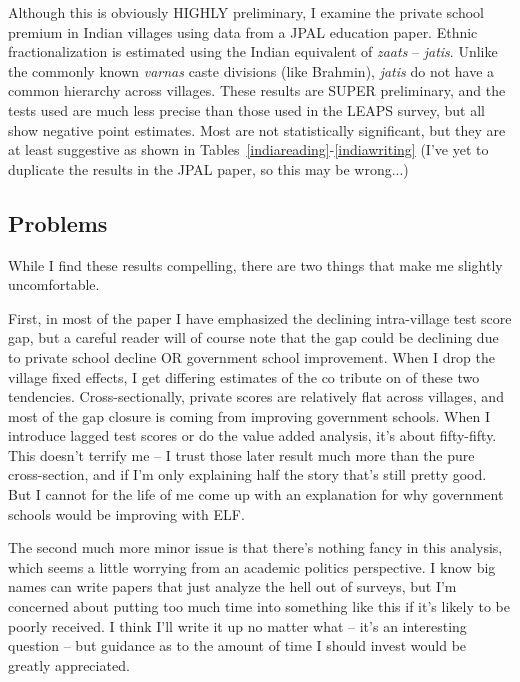 \documentclass[12pt]{article}
\begin{document}
Although this is obviously HIGHLY preliminary, I examine the private school premium in Indian villages using data from a JPAL education paper. Ethnic fractionalization is estimated using the Indian equivalent of \emph{zaats} -- \emph{jatis}. Unlike the commonly known \emph{varnas} caste divisions (like Brahmin), \emph{jatis} do not have a common hierarchy across villages. These results are SUPER preliminary, and the tests used are much less precise than those used in the LEAPS survey, but all show negative point estimates. Most are not statistically significant, but they are at least suggestive as shown in Tables~\ref{indiareading}-\ref{indiawriting} (I've yet to duplicate the results in the JPAL paper, so this may be wrong...) 







\subsection{Problems}\label{problems}
While I find these results compelling, there are two things that make me slightly uncomfortable. 

First, in most of the paper I have emphasized the declining intra-village test score gap, but a careful reader will of course note that the gap could be declining due to private school decline OR government school improvement. When I drop the village fixed effects, I get differing estimates of the co tribute on of these two tendencies. Cross-sectionally, private scores are relatively flat across villages, and most of the gap closure is coming from improving government schools. When I introduce lagged test scores or do the value added analysis, it's about fifty-fifty. This doesn't terrify me -- I trust those later result much more than the pure cross-section, and if I'm only explaining half the story that's still pretty good. But I cannot for the life of me come up with an explanation for why government schools would be improving with ELF.

The second much more minor issue is that there's nothing fancy in this analysis, which seems a little worrying from an academic politics perspective. I know big names can write papers that just analyze the hell out of surveys, but I'm concerned about putting too much time into something like this if it's likely to be poorly received. I think I'll write it up no matter what -- it's an interesting question -- but guidance as to the amount of time I should invest would be greatly appreciated. 
\end{document}
